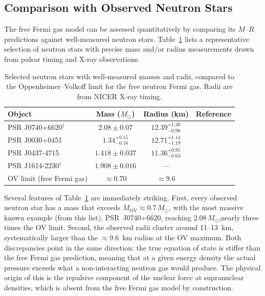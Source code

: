 \subsection{Comparison with Observed Neutron Stars}

The free Fermi gas model can be assessed quantitatively by comparing its
$M$--$R$ predictions against well-measured neutron stars. Table~\ref{tab:neutron-stars}
lists a representative selection of neutron stars with precise mass
and/or radius measurements drawn from pulsar timing and X-ray
observations.

\begin{table}[h]
    \centering
    \caption{Selected neutron stars with well-measured masses and radii,
        compared to the Oppenheimer--Volkoff limit for the free
        neutron Fermi gas. Radii are from NICER X-ray timing.}

    \label{tab:neutron-stars}
    \begin{tabular}{lccc}
        \toprule
        Object & Mass ($M_\odot$) & Radius (km) & Reference \\
        \midrule
        PSR J0740+6620$^\dagger$  & $2.08 \pm 0.07$ & $12.39^{+1.30}_{-0.98}$ & \cite{Fonseca2021, Riley2021} \\
        PSR J0030+0451            & $1.34^{+0.15}_{-0.16}$ & $12.71^{+1.14}_{-1.19}$ & \cite{Riley2019} \\
        PSR J0437-4715            & $1.418 \pm 0.037$ & $11.36^{+0.95}_{-0.63}$ & \cite{Choudhury2024} \\
        PSR J1614-2230$^\dagger$  & $1.908 \pm 0.016$ & --- & \cite{Demorest2010} \\
        \midrule
        OV limit (free Fermi gas) & $\approx 0.70$ & $\approx 9.6$ & \cite{Oppy} \\
        \bottomrule
    \end{tabular}
\end{table}

Several features of Table~\ref{tab:neutron-stars} are immediately
striking. First, every observed neutron star has a mass that exceeds
$M_{\mathrm{OV}} \approx 0.7\,M_\odot$, with the most massive known
example (from this list), PSR~J0740+6620, reaching $2.08\,M_\odot$,nearly three times the OV limit. Second, the observed radii cluster around 11--13~km,
systematically larger than the $\approx 9.6$~km radius at the OV
maximum. Both discrepancies point in the same direction: the true
equation of state is stiffer than the free Fermi gas prediction,
meaning that at a given energy density the actual pressure exceeds what
a non-interacting neutron gas would produce. The physical origin of this is the repulsive component of the nuclear force at
supranuclear densities, which is absent from the free Fermi gas model
by construction.\cite{Lattimer2012}
